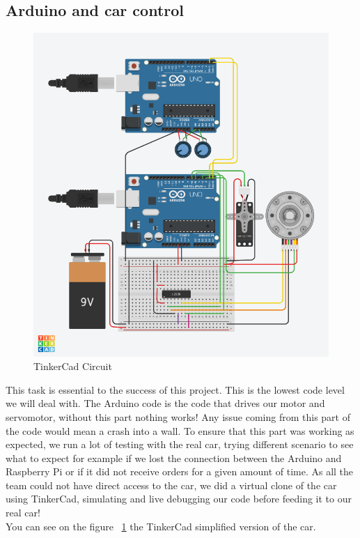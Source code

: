 \documentclass[12pt]{article}
\begin{document}
\subsection{Arduino and car control}

\begin{figure}[b!]
    \includegraphics[width=\textwidth]{../../docs/car-hardware.png}
    \caption{TinkerCad Circuit}
    \label{fig:tinkercad}
\end{figure}

This task is essential to the success of this project. This is the lowest code level we will deal with. The Arduino code is the code that drives our motor and servomotor, without this part nothing works! Any issue coming from this part of the code would mean a crash into a wall. To ensure that this part was working as expected, we run a lot of testing with the real car, trying different scenario to see what to expect for example if we lost the connection between the Arduino and Raspberry Pi or if it did not receive orders for a given amount of time. As all the team could not have direct access to the car, we did a virtual clone of the car using TinkerCad, simulating and live debugging our code before feeding it to our real car!\\
You can see on the figure ~\ref{fig:tinkercad} the TinkerCad simplified version of the car.
\end{document}
